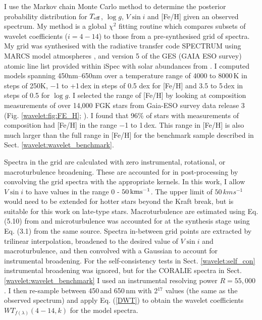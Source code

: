 I use the Markov chain Monte Carlo method to determine the posterior probability distribution for $T_{\rm eff}$, $\log g$, $V \sin i$ and [Fe/H] given an observed spectrum. My method is a global $\chi^2$ fitting routine which compares subsets of wavelet coefficients ($i=4-14$) to those from a pre-synthesised grid of spectra. My grid was synthesised with the radiative transfer code SPECTRUM \citep{1994AJ....107..742G} using MARCS model atmospheres \citep{2008A&A...486..951G}, and version 5 of the GES (GAIA ESO survey)  atomic line list provided within iSpec \citep{2016csss.confE..22B} with solar abundances from \cite{2009ARA&A..47..481A}. I computed models spanning 450nm--650nm over a temperature range of 4000 to 8000\,K in steps of 250K, $-$1 to +1\,dex in steps of 0.5 dex for [Fe/H] and 3.5 to 5\,dex in steps of 0.5 for $\log g$. I selected the range of [Fe/H] by looking at composition measurements of over 14,000 FGK stars from Gaia-ESO survey data release 3 (Fig. \ref{wavelet:fig:FE_H}; \citealt{2014A&A...570A.122S}). I found that 96\% of stars with measurements of composition had [Fe/H] in the range $-$1 to 1\,dex. This range in [Fe/H] is also much larger than the full  range in [Fe/H] for the benchmark sample described in Sect. \ref{wavelet:wavelet_benchmark}. 


Spectra in the grid are calculated with zero instrumental, rotational, or macroturbulence broadening. These are accounted for in post-processing by convolving the grid spectra with the appropriate kernels. In this work, I allow $V \sin i$ to have values in the range $0$ - $50 \, \rm kms^{-1}$. The upper limit of $50\,kms^{-1}$ would need to be extended for hotter stars beyond the Kraft break, but is suitable for this work on late-type stars. Macroturbulence are estimated using Eq. (5.10) from \citet{Doyle2015} and microturbulence was accounted for at the synthesis stage using Eq. (3.1) from the same source. Spectra in-between grid points are extracted by trilinear interpolation, broadened to the desired value of $V \sin i$ and macroturbulence, and then convolved with a Gaussian to account for  instrumental broadening. For the self-consistency tests in Sect. \ref{wavelet:self_con} instrumental broadening was ignored, but for the CORALIE spectra in Sect. \ref{wavelet:wavelet_benchmark} I used an instrumental resolving power $R = 55,000$ \citep{2001Msngr.105....1Q,Doyle2015}. I then re-sample between 450\,and 650\,nm with 2$^{17}$ values (the same as the observed spectrum) and apply Eq. (\ref{DWT}) to obtain the wavelet coefficients $WT_{f(\lambda)}(4-14,k)$ for the model spectra. 

